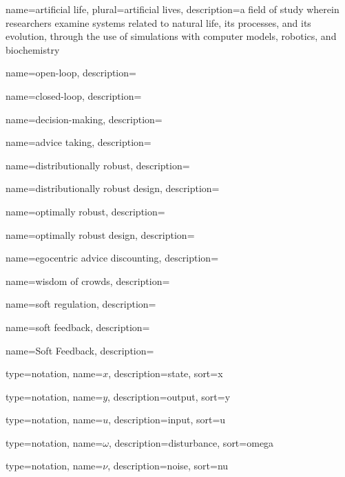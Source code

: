 

	{
		name={artificial life},
		plural={artificial lives},
		description={a field of study wherein researchers examine systems related to natural life, its processes, and its evolution, through the use of simulations with computer models, robotics, and biochemistry}
	}

	{
		name={open-loop},
		description={}
	}

	{
		name={closed-loop},
		description={}
	}	
	
	{
		name={decision-making},
		description={}
	}

	{
		name={advice taking},
		description={}
	}	
	
	{
		name={distributionally robust},
		description={}
	}
	
	{
		name={distributionally robust design},
		description={}
	}	

	{
		name={optimally robust},
		description={}
	}

	{
		name={optimally robust design},
		description={}
	}

	{
		name={egocentric advice discounting},
		description={}
	}
	
	{
		name={wisdom of crowds},
		description={}
	}

	{
		name={soft regulation},
		description={}
	}

	{
		name={soft feedback},
		description={}
	}

	{
		name={Soft Feedback},
		description={}
	}	


  {
    type=notation,
	name={\ensuremath{x}},
    description={state},
    sort={x}
  }
  
  {
    type=notation,
	name={\ensuremath{y}},
    description={output},
    sort={y}
  }  

  {
    type=notation,
	name={\ensuremath{u}},
    description={input},
    sort={u}
  }

  {
    type=notation,
	name={\ensuremath{\omega}},
    description={disturbance},
    sort={omega}
  }

  {
    type=notation,
	name={\ensuremath{\nu}},
    description={noise},
    sort={nu}
  }  